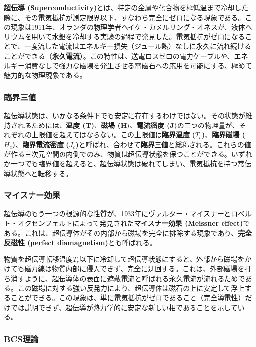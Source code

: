 \documentclass[11pt,a4paper]{ltjsarticle}
\begin{document}
\textbf{超伝導 (Superconductivity)}とは、特定の金属や化合物を極低温まで冷却した際に、その電気抵抗が測定限界以下、すなわち完全にゼロになる現象である。この現象は1911年、オランダの物理学者ヘイケ・カメルリング・オネスが、液体ヘリウムを用いて水銀を冷却する実験の過程で発見した。電気抵抗がゼロになることで、一度流した電流はエネルギー損失（ジュール熱）なしに永久に流れ続けることができる（\textbf{永久電流}）。この特性は、送電ロスゼロの電力ケーブルや、エネルギー消費なしで強力な磁場を発生させる電磁石への応用を可能にする、極めて魅力的な物理現象である。

\subsubsection*{臨界三値}

超伝導状態は、いかなる条件下でも安定に存在するわけではない。その状態が維持されるためには、\textbf{温度 (T)}、\textbf{磁場 (H)}、\textbf{電流密度 (J)}の三つの物理量が、それぞれの上限値を超えてはならない。この上限値は\textbf{臨界温度 ($T_c$)}、\textbf{臨界磁場 ($H_c$)}、\textbf{臨界電流密度 ($J_c$)}と呼ばれ、合わせて\textbf{臨界三値}と総称される。これらの値が作る三次元空間の内側でのみ、物質は超伝導状態を保つことができる。いずれか一つでも臨界値を超えると、超伝導状態は破れてしまい、電気抵抗を持つ常伝導状態へと転移する。

\subsubsection*{マイスナー効果}

超伝導のもう一つの根源的な性質が、1933年にヴァルター・マイスナーとロベルト・オクセンフェルトによって発見された\textbf{マイスナー効果 (Meissner effect)}である。これは、超伝導体がその内部から磁場を完全に排除する現象であり、\textbf{完全反磁性 (perfect diamagnetism)}とも呼ばれる。

物質を超伝導転移温度$T_c$以下に冷却して超伝導状態にすると、外部から磁場をかけても磁力線は物質内部に侵入できず、完全に迂回する。これは、外部磁場を打ち消すように、超伝導体の表面に遮蔽電流と呼ばれる永久電流が流れるためである。この磁場に対する強い反発力により、超伝導体は磁石の上に安定して浮上することができる。この現象は、単に電気抵抗がゼロであること（完全導電性）だけでは説明できず、超伝導が熱力学的に安定な新しい相であることを示している。

\subsubsection*{BCS理論}
\end{document}
